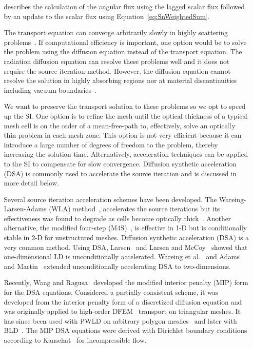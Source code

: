 \documentclass{article}
\begin{document}
\noindent describes the calculation of the angular flux using the lagged scalar flux followed by an update to the scalar flux using Equation~\ref{eq:SnWeightedSum}.

The transport equation can converge arbitrarily slowly in highly scattering problems~\cite{LarsenStableDSATheory}. If computational efficiency is important, one option would be to solve the problem using the diffusion equation instead of the transport equation. The radiation diffusion equation can resolve these problems well and it does not require the source iteration method. However, the diffusion equation cannot resolve the solution in highly absorbing regions nor at material discontinuities including vacuum boundaries~\cite{D&H}.

We want to preserve the transport solution to these problems so we opt to speed up the SI. One option is to refine the mesh until the optical thickness of a typical mesh cell is on the order of a mean-free-path to, effectively, solve an optically thin problem in each mesh zone. This option is not very efficient because it can introduce a large number of degrees of freedom to the problem, thereby increasing the solution time. Alternatively, acceleration techniques can be applied to the SI to compensate for slow convergence. Diffusion synthetic acceleration (DSA) is commonly used to accelerate the source iteration and is discussed in more detail below.

Several source iteration acceleration schemes have been developed. The Wareing-Larsen-Adams (WLA) method~\cite{WareingDSADFEM}, accelerates the source iterations but its effectiveness was found to degrade as cells become optically thick~\cite{WarsaFullyConsistentLDDSA}. Another alternative, the modified four-step (M4S)~\cite{AdamsFastIterativeMethods}, is effective in 1-D but is conditionally stable in 2-D for unstructured meshes. Diffusion synthetic acceleration (DSA) is a very common method. Using DSA, Larsen~\cite{LarsenStableDSATheory} and Larsen and McCoy~\cite{LarsenStableDSANumericalResults} showed that one-dimensional LD is unconditionally accelerated. Wareing et al.~\cite{WareingDSADFEM} and Adams and Martin~\cite{AdamsDSADFEM} extended unconditionally accelerating DSA to two-dimensions.

Recently, Wang and Ragusa~\cite{WangRagusaDSA} developed the modified interior penalty (MIP) form for the DSA equations. Considered a partially consistent scheme, it was developed from the interior penalty form of a discretized diffusion equation and was originally applied to high-order DFEM \SN\ transport on triangular meshes. It has since been used with PWLD on arbitrary polygon meshes~\cite{TurcksinDiscontinuousDSA} and later with BLD~\cite{TurcksinDSABLD}. The MIP DSA equations were derived with Dirichlet boundary conditions according to Kanschat~\cite{KanschatDGViscousIncompressFlow} for incompressible flow.
\end{document}
